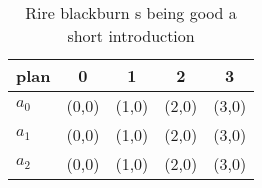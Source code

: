 \documentclass[a4paper]{article}
\begin{document}
\begin{table}
\begin{adjustbox}{width=0.5\columnwidth}
\begin{tabular}{|l|l|l|l|l|}
\hline
\textbf{plan} & \multicolumn{1}{c|}{\textbf{0}} & \multicolumn{1}{c|}{\textbf{1}} & \multicolumn{1}{c|}{\textbf{2}} & \multicolumn{1}{c|}{\textbf{3}} \\ \hline
\textbf{$a_0$}  & (0,0) & (1,0) & (2,0) & (3,0) \\ \hline
\textbf{$a_1$}  & (0,0) & (1,0) & (2,0) & (3,0) \\ \hline
\textbf{$a_2$}  & (0,0) & (1,0) & (2,0) & (3,0) \\ \hline
\end{tabular}
\end{adjustbox}
\caption{Rire blackburn s being good a short introduction 
}
\end{table}
\end{document}
